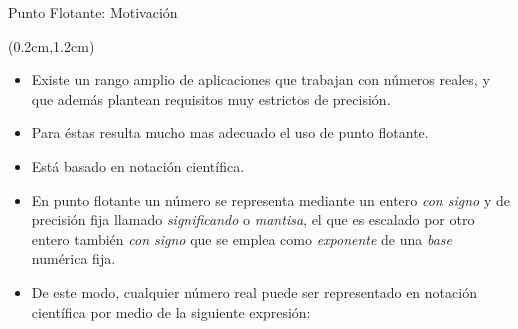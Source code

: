 \begin{frame}{Punto Flotante: Motivación}
 \begin{textblock*}{\textwidth}(0.2cm,1.2cm)
  \begin{itemize} [<+(1)->]\justifying
   \item Existe un rango amplio de aplicaciones que trabajan con números reales, y que además plantean requisitos muy estrictos de precisión.
   \item Para éstas resulta mucho mas adecuado el uso de punto flotante.
   \item Está basado en notación científica.
   \item En punto flotante un número se representa mediante un entero \textit{con signo} y de precisión fija llamado \textit{significando} o \textit{mantisa}, el que es escalado por otro entero también \textit{con signo} que se emplea como \textit{exponente} de una \textit{base} numérica fija.
   \item De este modo, cualquier número real puede ser representado en notación científica por medio de la siguiente expresión:
  \end{itemize}
{\hangindent=0.8cm
\par}
 \end{textblock*}
\end{frame}

